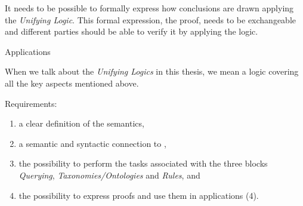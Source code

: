 %
%
%
It needs to be possible to formally express how conclusions are drawn applying the \emph{Unifying Logic}. This formal expression, the proof, needs to be exchangeable 
and different parties should be able to verify it by applying the logic. %

Applications

When we talk about the \emph{Unifying Logics} in this thesis, we mean a logic covering all the key aspects mentioned above.

Requirements:
\begin{enumerate}
\item a clear definition of the semantics,
\item a semantic and syntactic connection to \rdf, 
\item the possibility to perform the tasks associated with 
the three blocks \emph{Querying}, \emph{Taxonomies/Ontologies}
and \emph{Rules}, and 
\item the possibility to express proofs and use them in applications (4).
\end{enumerate}


